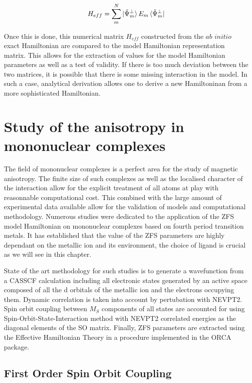\documentclass[10pt]{report}
\numberwithin{equation}{section}
\begin{document}
\begin{equation}
    H_{eff}=\sum_{m}^{N}\ket{\tilde{\Psi}_m^{\bot}}E_m \bra{\tilde{\Psi}_m^{\bot}}
\end{equation}

Once this is done, this numerical matrix $H_{eff}$ constructed from the $\textit{ab}$ $\textit{initio}$ exact Hamiltonian are compared to the model Hamiltonian representation matrix. 
This allows for the extraction of values for the model Hamiltonian parameters as well as a test of validity.
If there is too much deviation between the two matrices, it is possible that there is some missing interaction in the model.
In such a case, analytical derivation allows one to derive a new Hamiltoninan from a more sophisticated Hamiltonian.

\chapter{Study of the anisotropy in mononuclear complexes}

The field of mononuclear complexes is a perfect area for the study of magnetic anisotropy. 
The finite size of such complexes as well as the localised character of the interaction allow for the explicit treatment of all atoms at play with reasonnable computational cost.
This combined with the large amount of experimental data available allow for the validation of models and computational methodology.
Numerous studies were dedicated to the application of the ZFS model Hamiltonian on mononuclear complexes based on fourth period transition metals.
It has established that the value of the ZFS parameters are highly dependant on the metallic ion and its environment, the choice of ligand is crucial as we will see in this chapter.
\par State of the art methodology for such studies is to generate a wavefunction from a CASSCF calculation including all electronic states generated by an active space composed of all the d orbitals of the metallic ion and the electrons occupying them. 
Dynamic correlation is taken into account by pertubation with NEVPT2. 
Spin orbit coupling between $M_S$ components of all states are accounted for using Spin-Orbit-State-Interaction method with NEVPT2 correlated energies as the diagonal elements of the SO matrix.
Finally, ZFS parameters are extracted using the Effective Hamiltonian Theory in a procedure implemented in the ORCA package.

\section{First Order Spin Orbit Coupling}
\end{document}
